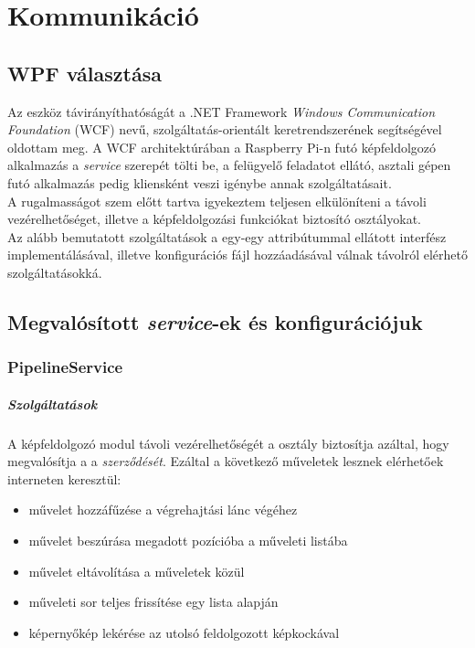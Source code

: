 \chapter{Kommunikáció}
\section{WPF választása}
Az eszköz távirányíthatóságát a .NET Framework \emph{Windows Communication Foundation} (WCF) nevű, szolgáltatás-orientált keretrendszerének segítségével oldottam meg. A WCF architektúrában a Raspberry Pi-n futó képfeldolgozó alkalmazás a \textit{service} szerepét tölti be, a felügyelő feladatot ellátó, asztali gépen futó alkalmazás pedig kliensként veszi igénybe annak szolgáltatásait.\\
A rugalmasságot szem előtt tartva igyekeztem teljesen elkülöníteni a távoli vezérelhetőséget, illetve a képfeldolgozási funkciókat biztosító osztályokat.\\
Az alább bemutatott szolgáltatások a egy-egy  attribútummal ellátott interfész implementálásával, illetve konfigurációs fájl hozzáadásával válnak távolról elérhető szolgáltatásokká.

\section{Megvalósított \emph{service}-ek és konfigurációjuk}
\subsection{PipelineService}

\paragraph{Szolgáltatások}
A képfeldolgozó modul távoli vezérelhetőségét a  osztály biztosítja azáltal, hogy megvalósítja a a  \textit{szerződését}. Ezáltal a következő műveletek lesznek elérhetőek interneten keresztül:
\begin{itemize}
\item művelet hozzáfűzése a végrehajtási lánc végéhez
\item művelet beszúrása megadott pozícióba a műveleti listába
\item művelet eltávolítása a műveletek közül
\item műveleti sor teljes frissítése egy lista alapján
\item képernyőkép lekérése az utolsó feldolgozott képkockával
\end{itemize}

